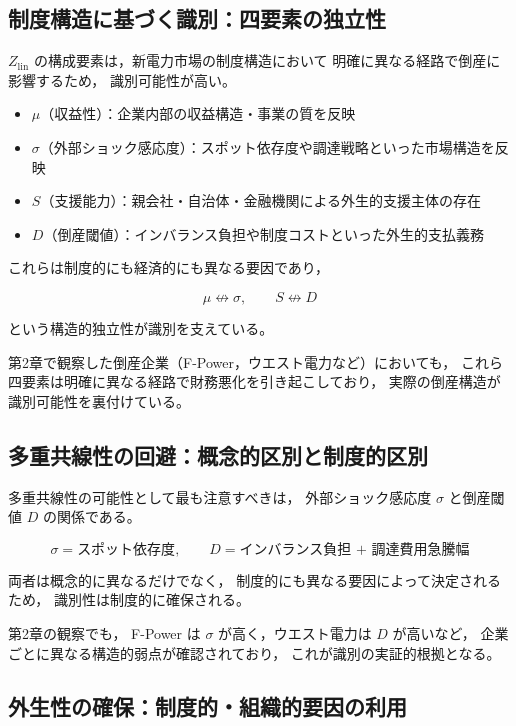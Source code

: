 \subsection{制度構造に基づく識別：四要素の独立性}

$Z_{\text{lin}}$ の構成要素は，新電力市場の制度構造において
明確に異なる経路で倒産に影響するため，
識別可能性が高い。

\begin{itemize}
    \item $\mu$（収益性）：企業内部の収益構造・事業の質を反映
    \item $\sigma$（外部ショック感応度）：スポット依存度や調達戦略といった市場構造を反映
    \item $S$（支援能力）：親会社・自治体・金融機関による外生的支援主体の存在
    \item $D$（倒産閾値）：インバランス負担や制度コストといった外生的支払義務
\end{itemize}

これらは制度的にも経済的にも異なる要因であり，



\[
\mu \not\leftrightarrow \sigma,\qquad
S \not\leftrightarrow D
\]



という構造的独立性が識別を支えている。

第2章で観察した倒産企業（F-Power，ウエスト電力など）においても，
これら四要素は明確に異なる経路で財務悪化を引き起こしており，
実際の倒産構造が識別可能性を裏付けている。

\subsection{多重共線性の回避：概念的区別と制度的区別}

多重共線性の可能性として最も注意すべきは，
外部ショック感応度 $\sigma$ と倒産閾値 $D$ の関係である。



\[
\sigma = \text{スポット依存度},\qquad
D = \text{インバランス負担 + 調達費用急騰幅}
\]



両者は概念的に異なるだけでなく，
制度的にも異なる要因によって決定されるため，
識別性は制度的に確保される。

第2章の観察でも，
F-Power は $\sigma$ が高く，ウエスト電力は $D$ が高いなど，
企業ごとに異なる構造的弱点が確認されており，
これが識別の実証的根拠となる。

\subsection{外生性の確保：制度的・組織的要因の利用}

